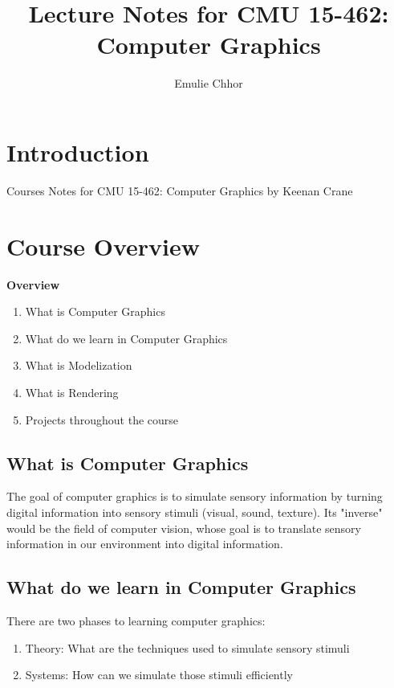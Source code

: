 \documentclass{article}
\begin{document}
\title{Lecture Notes for CMU 15-462: Computer Graphics}
\author{Emulie Chhor}
\maketitle

\section*{Introduction}

Courses Notes for CMU 15-462: Computer Graphics by Keenan Crane

\section{Course Overview}

\textbf{Overview}

\begin{enumerate}
    \item What is Computer Graphics
    \item What do we learn in Computer Graphics
    \item What is Modelization
    \item What is Rendering
    \item Projects throughout the course
\end{enumerate}

\subsection{What is Computer Graphics}

The goal of computer graphics is to simulate sensory information by
turning digital information into sensory stimuli (visual, sound, texture).
Its "inverse" would be the field of computer vision, whose goal is to
translate sensory information in our environment into digital information.

\subsection{What do we learn in Computer Graphics}

There are two phases to learning computer graphics:
\begin{enumerate}
    \item Theory: What are the techniques used to simulate sensory stimuli
    \item Systems: How can we simulate those stimuli efficiently
\end{enumerate}
\end{document}
